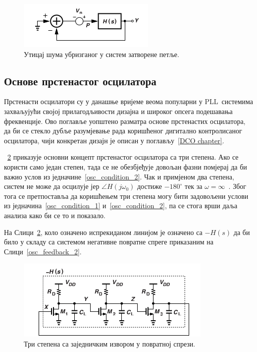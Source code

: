 \documentclass[master]{finthesis}
\def \PLL  {PLL} %
\begin{document}
\begin{figure}[!ht]
	 \centering
	 \includegraphics[scale=0.8]{slike/osc_feedback_6.png}
	 \caption{Утицај шума убризганог у систем затворене петље.}
	 \label{osc_feedback_6}
\end{figure}

\subsection{Основе прстенастог осцилатора}
Прстенасти осцилатори су у данашње вријеме веома популарни у \PLL\ системима захваљујући својој прилагодљивости дизајна и широког опсега подешавања фреквенције. Ово поглавље уопштено разматра основе прстенастих осцилатора, да би се стекло дубље разумјевање рада коришћеног дигитално контролисаног осцилатора, чији конкретан дизајн је описан у поглављу~\ref{DCO chapter}. \par
\figurename~\ref{ring_osc_1} приказује основни концепт прстенастог осцилатора са три степена. Ако се користи само један степен, тада се не обезбјеђује довољан фазни помјерај да би важио услов из једначине~\ref{osc_condition_2}. Чак и примјеном два степена, систем не може да осцилује јер $\angle H(j\omega_{0})$ достиже $-180^{\circ}$ тек за $\omega=\infty$~\cite{Razavi:PLL_CMOS_2020}. Због тога се претпоставља да коришћењем три степена могу бити задовољени услови из једначина~\ref{osc_condition_1} и~\ref{osc_condition_2}, па се стога врши даља анализа како би се то и показало. \par 
На Слици~\ref{ring_osc_1}, коло означено испрекиданом линијом је означено са $-H(s)$ да би било у складу са системом негативне повратне спреге приказаним на Слици~\ref{osc_feedback_2}. \par
\begin{figure}[!ht]
	 \centering
	 \includegraphics[scale=0.8]{slike/ring_osc_1.png}
	 \caption{Три степена са заједничким извором у повратној спрези.}
	 \label{ring_osc_1}
\end{figure}
\end{document}
